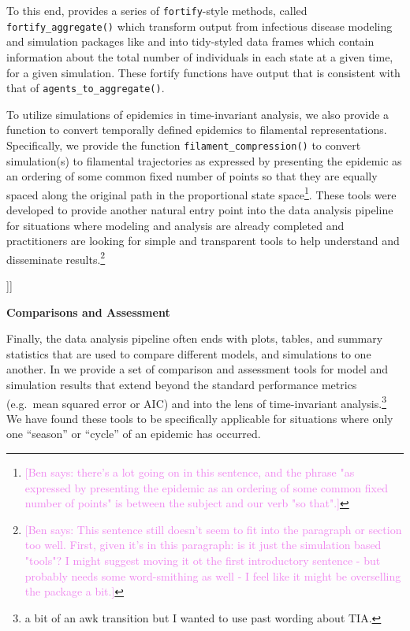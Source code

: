 \documentclass[
  shortnames]{jss}
\begin{document}
To this end,  provides a series of
\texttt{fortify}-style methods, called \texttt{fortify\_aggregate()}
which transform output from infectious disease modeling and simulation
packages like  and  into tidy-styled data frames
which contain information about the total number of individuals in each
state at a given time, for a given simulation. These fortify functions
have output that is consistent with that of
\texttt{agents\_to\_aggregate()}.

To utilize simulations of epidemics in time-invariant analysis, we also
provide a function to convert temporally defined epidemics to filamental
representations. Specifically, we provide the function
\texttt{filament\_compression()} to convert simulation(s) to filamental
trajectories as expressed by presenting the epidemic as an ordering of
some common fixed number of points so that they are equally spaced along
the original path in the proportional state
space\footnote{\textcolor{violet}{[Ben says: there's a lot going on in this sentence, and the phrase "as expressed by presenting the epidemic as an ordering of some common fixed number of points" is between the subject and our verb "so that".]}}.
These tools were developed to provide another natural entry point into
the  data analysis pipeline for situations where
modeling and analysis are already completed and practitioners are
looking for simple and transparent tools to help understand and
disseminate
results.\footnote{\textcolor{violet}{[Ben says: This sentence still doesn't seem to fit into the paragraph or section too well. First, given it's in this paragraph: is it just the simulation based "tools"? I might suggest moving it ot the first introductory sentence - but probably needs some word-smithing as well - I feel like it might be overselling the package a bit.]}}

{]}{]}

\textbf{Comparisons and Assessment}

Finally, the data analysis pipeline often ends with plots, tables, and
summary statistics that are used to compare different models, and
simulations to one another. In  we provide a set of
comparison and assessment tools for model and simulation results that
extend beyond the standard performance metrics (e.g.~mean squared error
or AIC) and into the lens of time-invariant
analysis.\footnote{a bit of an awk transition but I wanted to use past wording about TIA.}
We have found these tools to be specifically applicable for situations
where only one ``season'' or ``cycle'' of an epidemic has occurred.
\end{document}
